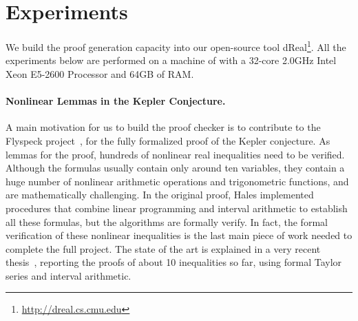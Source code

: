 \section{Experiments}\label{kepler}

We build the proof generation capacity into our open-source tool {\sf
  dReal}\footnote{ \url{http://dreal.cs.cmu.edu} }. All the
experiments below are performed on a machine of with a 32-core 2.0GHz Intel
Xeon E5-2600 Processor and 64GB of RAM.



\paragraph{Nonlinear Lemmas in the Kepler Conjecture.} A main motivation for us to build the proof checker is to contribute
to the Flyspeck project~\cite{DBLP:conf/dagstuhl/Hales05}, for the
fully formalized proof of the Kepler conjecture. As lemmas for the
proof, hundreds of nonlinear real inequalities need to be verified.
Although the formulas usually contain only around ten variables, they
contain a huge number of nonlinear arithmetic operations and
trigonometric functions, and are mathematically challenging. In the original proof, Hales implemented procedures that combine
linear programming and interval arithmetic to establish all these
formulas, but the algorithms are formally verify. In
fact, the formal verification of these nonlinear inequalities is the last main piece
of work needed to complete the full project. The state of the art is
explained in a very recent thesis~\cite{keplerthesis}, reporting the
proofs of about 10 inequalities so far, using formal Taylor series and
interval arithmetic.

